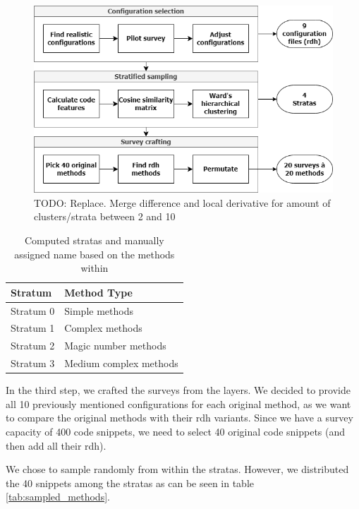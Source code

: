 \documentclass[%
class=scrreprt,
chapterprefix=false,%
open=right,%
twoside=false,%
paper=a4,%
logofile={Logo\_zentral\_farbig\_EN.png},%
thesistype=master,%
UKenglish,%
]{se2thesis}
\theoremstyle{definition}
\begin{document}
	\begin{figure}[t]
		\centering
		\includegraphics[width=\textwidth]{img/survey_pipeline.png}
		\caption{TODO: Replace. Merge difference and local derivative for amount of clusters/strata between 2 and 10} 
		\label{fig:survey_cluster_amount}
	\end{figure}
	
	\begin{table}[htbp]
		\centering
		\begin{tabular}{ll}
			\toprule
			\textbf{Stratum} & \textbf{Method Type} \\
			\midrule
			Stratum 0 & Simple methods \\
			Stratum 1 & Complex methods \\
			Stratum 2 & Magic number methods \\
			Stratum 3 & Medium complex methods \\
			\bottomrule
		\end{tabular}
		\caption{Computed stratas and manually assigned name based on the methods within}
		\label{tab:survey_strata_labeles}
	\end{table}
		
	In the third step, we crafted the surveys from the layers. We decided to provide all 10 previously mentioned configurations for each original method, as we want to compare the original methods with their rdh variants. Since we have a survey capacity of 400 code snippets, we need to select 40 original code snippets (and then add all their rdh).	
	
	We chose to sample randomly from within the stratas. However, we distributed the 40 snippets among the stratas as can be seen in table \ref{tab:sampled_methods}.
	
\end{document}
